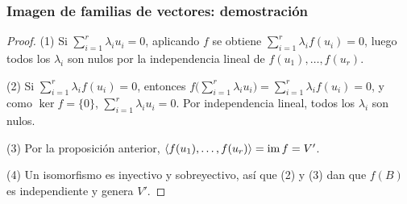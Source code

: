 \begin{frame}
    \frametitle{Imagen de familias de vectores: demostración}

    \begin{proof}
        \alert{(1)} Si $\sum_{i=1}^r\lambda_iu_i=0$, aplicando $f$ se obtiene
        $\sum_{i=1}^r\lambda_if(u_i)=0$, luego todos los $\lambda_i$ son nulos
        por la independencia lineal de $f(u_1),\ldots,f(u_r)$.

        \alert{(2)} Si $\sum_{i=1}^r\lambda_if(u_i)=0$, entonces
        $f\bigl(\sum_{i=1}^r\lambda_iu_i\bigr)=\sum_{i=1}^r\lambda_if(u_i)=0$, y como $\ker f=\{0\}$,
        $\sum_{i=1}^r\lambda_iu_i=0$. Por independencia lineal, todos los $\lambda_i$
        son nulos.

        \alert{(3)} Por la proposición anterior,
        $\langle f(u_1),\ldots,f(u_r)\rangle=\operatorname{im} f=V'$.

        \alert{(4)} Un isomorfismo es inyectivo y sobreyectivo, así que
        (2) y (3) dan que $f(B)$ es independiente y genera $V'$.
    \end{proof}
\end{frame}


